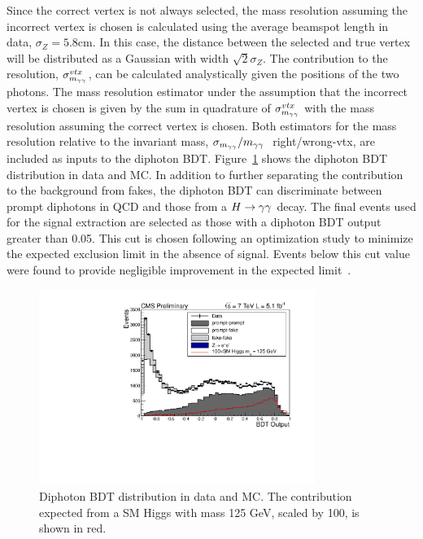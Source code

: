 Since the correct vertex is not always selected, the mass resolution assuming the incorrect vertex is chosen
is calculated using the average beamspot length in data, $\sigma_{Z}=5.8$cm. In this case, the distance 
between the selected and true vertex will be distributed as a Gaussian with width $\sqrt{2}\sigma_{Z}$.
The contribution to the resolution, $\sigma_{m_{\gamma\gamma}}^{vtx}$, can be calculated analystically given the positions of
the two photons. The mass resolution estimator under the assumption that the incorrect vertex is chosen is 
given by the sum in quadrature of $\sigma_{m_{\gamma\gamma}}^{vtx}$ with the mass resolution assuming the correct vertex is chosen.
Both estimators for the mass resolution relative to the invariant mass, $\sigma_{m_{\gamma\gamma}}/m_{\gamma\gamma}~$ right/wrong-vtx, 
are included as inputs to the diphoton BDT. Figure~\ref{fig:diphotonBDT} shows the diphoton BDT distribution in 
data and MC. In addition to further separating the contribution to the background from fakes, the diphoton BDT 
can discriminate between prompt diphotons in QCD and those from a $H\rightarrow\gamma\gamma$ decay. The final events used for 
the signal extraction are selected as those with a diphoton BDT output greater than 0.05. This cut is chosen
following an optimization study to minimize the expected exclusion limit in the absence of signal.
Events below this cut value were found to provide negligible improvement in the expected limit~\cite{AN-12-048}.

\begin{figure}[hbt!]
\begin{center}
 \includegraphics[width=0.8\textwidth]{hgg7TeV/variablePlots/bdtoutput_full}
 \caption{Diphoton BDT distribution in data and MC. The contribution expected from a SM Higgs with mass 125 GeV, 
 scaled by 100, is shown in red. }
 \label{fig:diphotonBDT}
\end{center}
\end{figure}

